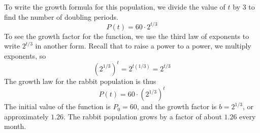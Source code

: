 \documentclass[10pt,]{book}
\theoremstyle{plain}
\theoremstyle{definition}
\theoremstyle{definition}
\theoremstyle{definition}
\theoremstyle{definition}
\theoremstyle{definition}
\numberwithin{equation}{section}
\begin{document}
    To write the growth formula for this population, we divide the value of \(t\) by \(3\) to find the number of doubling periods.
    \begin{equation*}P(t) = 60 \cdot 2^{t/3}\end{equation*}
    To see the growth factor for the function, we use the third law of exponents to write \(2^{t/3}\) in another form. Recall that to raise a power to a power, we multiply exponents, so
    \begin{equation*}\left(2^{1/3}\right)^t = 2^{t (1/3)} = 2^{t/3}\end{equation*}
    The growth law for the rabbit population is thus
    \begin{equation*}P(t) = 60 \cdot \left(2^{1/3}\right)^t\end{equation*}
    The initial value of the function is \(P_0 = 60\), and the growth factor is \(b = 2^{1/3}\), or approximately \(1.26\). The rabbit population grows by a factor of about \(1.26\) every month.
%
\par
\end{document}
